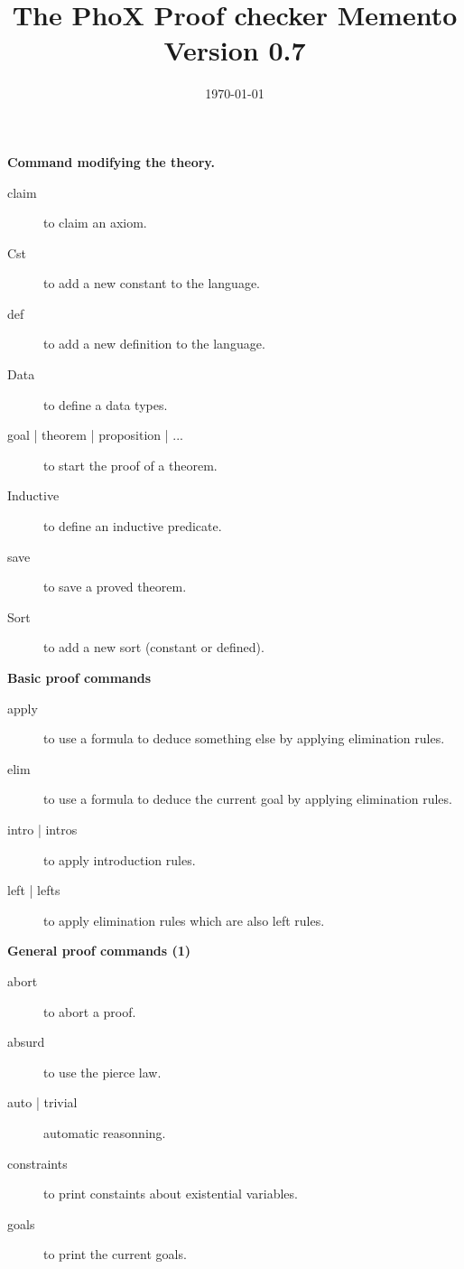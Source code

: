 \documentclass[long]{slides}
\title{The PhoX Proof checker Memento \\
                {\footnotesize Version 0.7}}
\date{\today}
\author{}
\begin{document}
\maketitle

\begin{slide}{\bf Command modifying the theory.}
\begin{description}
\item[claim] to claim an axiom.
\item[Cst] to add a new constant to the language.
\item[def] to add a new definition to the language.
\item[Data] to define a data types.
\item[goal | theorem | proposition | ... ] to start the proof of a theorem.
\item[Inductive] to define an inductive predicate.
\item[save] to save a proved theorem.
\item[Sort] to add a new sort (constant or defined).
\end{description}
\end{slide}

\begin{slide}{\bf Basic proof commands}
\begin{description}
\item[apply] to use a formula to deduce something else by applying
elimination rules.
\item[elim] to use a formula to deduce the current goal by applying
elimination rules.
\item[intro | intros] to apply introduction rules.
\item[left | lefts] to apply elimination rules which are also left rules.
\end{description}
\end{slide}

\begin{slide}{\bf General proof commands (1)}
\begin{description}
\item[abort] to abort a proof.
\item[absurd] to use the pierce law.
\item[auto | trivial] automatic reasonning.
\item[constraints] to print constaints about existential variables.
\item[goals] to print the current goals.
\end{description}
\end{slide}
\end{document}
